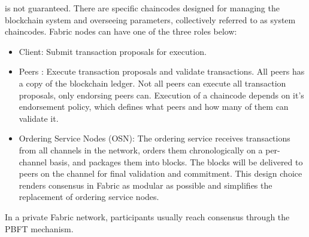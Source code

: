 is not guaranteed. There are specific chaincodes designed for managing the blockchain system and overseeing
parameters, collectively referred to as system chaincodes.
Fabric nodes can have one of the three roles below:
\begin{itemize}
    \item Client: Submit transaction proposals for execution.
    \item Peers : Execute transaction proposals and validate transactions. All peers has a copy of the blockchain ledger.
          Not all peers can execute all transaction proposals, only endorsing peers can. Execution of a chaincode depends on it's endorsement policy,
          which defines what peers and how many of them can validate it.
    \item  Ordering Service Nodes (OSN): The ordering service receives transactions from all channels in the network, orders them chronologically
          on a per-channel basis, and packages them into blocks. The blocks will be delivered to peers on the channel for final
          validation and commitment. This design choice renders consensus in Fabric as modular as possible and simplifies the replacement
          of ordering service nodes.
\end{itemize}
In a private Fabric network, participants usually reach consensus through the PBFT mechanism.
\cite{blockchainTech,hyperledger}

\pagebreak
